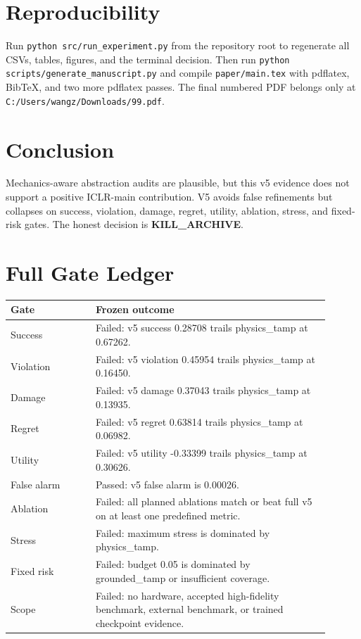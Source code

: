 \documentclass[11pt]{article}
\newcommand{\method}[1]{\texttt{#1}}
\begin{document}
\section{Reproducibility}
Run \method{python src/run\_experiment.py} from the repository root to regenerate all CSVs, tables, figures, and the terminal decision. Then run \method{python scripts/generate\_manuscript.py} and compile \method{paper/main.tex} with pdflatex, BibTeX, and two more pdflatex passes. The final numbered PDF belongs only at \method{C:/Users/wangz/Downloads/99.pdf}.

\section{Conclusion}
Mechanics-aware abstraction audits are plausible, but this v5 evidence does not support a positive ICLR-main contribution. V5 avoids false refinements but collapses on success, violation, damage, regret, utility, ablation, stress, and fixed-risk gates. The honest decision is \textbf{KILL\_ARCHIVE}.

\clearpage
\appendix
\section{Full Gate Ledger}
\begin{longtable}{p{0.24\linewidth}p{0.66\linewidth}}
\toprule
Gate & Frozen outcome \\
\midrule
Success & Failed: v5 success 0.28708 trails physics\_tamp at 0.67262. \\
Violation & Failed: v5 violation 0.45954 trails physics\_tamp at 0.16450. \\
Damage & Failed: v5 damage 0.37043 trails physics\_tamp at 0.13935. \\
Regret & Failed: v5 regret 0.63814 trails physics\_tamp at 0.06982. \\
Utility & Failed: v5 utility -0.33399 trails physics\_tamp at 0.30626. \\
False alarm & Passed: v5 false alarm is 0.00026. \\
Ablation & Failed: all planned ablations match or beat full v5 on at least one predefined metric. \\
Stress & Failed: maximum stress is dominated by physics\_tamp. \\
Fixed risk & Failed: budget 0.05 is dominated by grounded\_tamp or insufficient coverage. \\
Scope & Failed: no hardware, accepted high-fidelity benchmark, external benchmark, or trained checkpoint evidence. \\
\bottomrule
\end{longtable}
\end{document}
